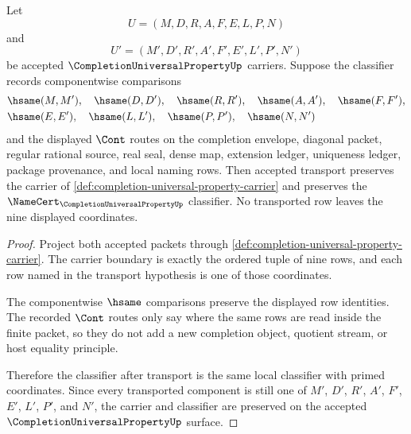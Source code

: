 \begin{theorem}
\label{thm:completion-universal-property-classifier-transport}
Let
$$
U=(M,D,R,A,F,E,L,P,N)
$$
and
$$
U'=(M',D',R',A',F',E',L',P',N')
$$
be accepted $\CompletionUniversalPropertyUp$ carriers. Suppose the classifier records componentwise comparisons
$$
\begin{aligned}
&\hsame(M,M'),\quad \hsame(D,D'),\quad \hsame(R,R'),\quad \hsame(A,A'),\quad \hsame(F,F'),\\
&\hsame(E,E'),\quad \hsame(L,L'),\quad \hsame(P,P'),\quad \hsame(N,N')
\end{aligned}
$$
and the displayed $\Cont$ routes on the completion envelope, diagonal packet, regular rational source, real seal, dense map, extension ledger, uniqueness ledger, package provenance, and local naming rows. Then accepted transport preserves the carrier of \autoref{def:completion-universal-property-carrier} and preserves the $\NameCert_{\CompletionUniversalPropertyUp}$ classifier. No transported row leaves the nine displayed coordinates.
\end{theorem}
\begin{proof}
Project both accepted packets through \autoref{def:completion-universal-property-carrier}. The carrier boundary is exactly the ordered tuple of nine rows, and each row named in the transport hypothesis is one of those coordinates.

The componentwise $\hsame$ comparisons preserve the displayed row identities. The recorded $\Cont$ routes only say where the same rows are read inside the finite packet, so they do not add a new completion object, quotient stream, or host equality principle.

Therefore the classifier after transport is the same local classifier with primed coordinates. Since every transported component is still one of $M'$, $D'$, $R'$, $A'$, $F'$, $E'$, $L'$, $P'$, and $N'$, the carrier and classifier are preserved on the accepted $\CompletionUniversalPropertyUp$ surface.
\end{proof}

